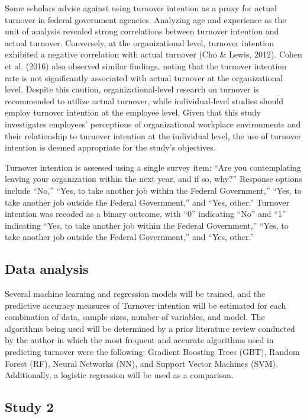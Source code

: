 \documentclass[
  jou]{apa6}
\begin{document}
Some scholars advise against using turnover intention as a proxy for actual turnover in federal government agencies.
Analyzing age and experience as the unit of analysis revealed strong correlations between turnover intention and actual turnover.
Conversely, at the organizational level, turnover intention exhibited a negative correlation with actual turnover (Cho \& Lewis, 2012).
Cohen et al. (2016) also observed similar findings, noting that the turnover intention rate is not significantly associated with actual turnover at the organizational level.
Despite this caution, organizational-level research on turnover is recommended to utilize actual turnover, while individual-level studies should employ turnover intention at the employee level.
Given that this study investigates employees' perceptions of organizational workplace environments and their relationship to turnover intention at the individual level, the use of turnover intention is deemed appropriate for the study's objectives.

Turnover intention is assessed using a single survey item: ``Are you contemplating leaving your organization within the next year, and if so, why?'' Response options include ``No,'' ``Yes, to take another job within the Federal Government,'' ``Yes, to take another job outside the Federal Government,'' and ``Yes, other.'' Turnover intention was recoded as a binary outcome, with ``0'' indicating ``No'' and ``1'' indicating ``Yes, to take another job within the Federal Government,'' ``Yes, to take another job outside the Federal Government,'' and ``Yes, other.''

\hypertarget{data-analysis}{%
\subsection{Data analysis}\label{data-analysis}}

Several machine learning and regression models will be trained, and the predictive accuracy measures of Turnover intention will be estimated for each combination of data, sample sizes, number of variables, and model.
The algorithms being used will be determined by a prior literature review conducted by the author in which the most frequent and accurate algorithms used in predicting turnover were the following: Gradient Boosting Trees (GBT), Random Forest (RF), Neural Networks (NN), and Support Vector Machines (SVM).
Additionally, a logistic regression will be used as a comparison.

\hypertarget{study-2}{%
\subsection{Study 2}\label{study-2}}
\end{document}
